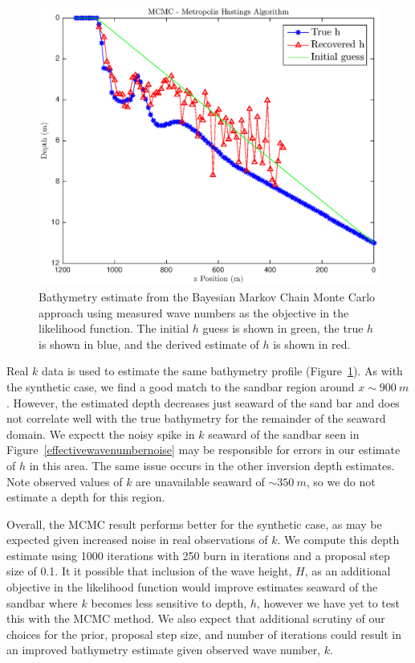 \begin{figure}[H]
\center
\includegraphics[scale=0.46]{img/REAL_plot1_chopped_propSD0_1prSD0_5_totstep1000_kOct9.eps}
\caption{Bathymetry estimate from the Bayesian Markov Chain Monte Carlo approach using measured wave numbers as the objective in the likelihood function. The initial $h$ guess is shown in green, the true $h$ is shown in blue, and the derived estimate of $h$ is shown in red.}
\label{mcmc-real}
\end{figure}

Real $k$ data is used to estimate the same bathymetry profile (Figure~\ref{mcmc-real}). As with the synthetic case, we find a good match to the sandbar region around $x\sim900~m$. However, the estimated depth decreases just seaward of the sand bar and does not correlate well with the true bathymetry for the remainder of the seaward domain. We expectt the noisy spike in $k$ seaward of the sandbar seen in  Figure~\ref{effectivewavenumbernoise} may be responsible for errors in our estimate of $h$ in this area. The same issue occurs in the other inversion depth estimates. Note observed values of $k$ are unavailable seaward of $\sim350~m$, so we do not estimate a depth for this region. 

Overall, the MCMC result performs better for the synthetic case, as may be expected given increased noise in real observations of $k$. We compute this depth estimate using 1000 iterations with 250 burn in iterations and a proposal step size of 0.1. It it possible that inclusion of the wave height, $H$, as an additional objective in the likelihood function would improve estimates seaward of the sandbar where $k$ becomes less sensitive to depth, $h$, however we have yet to test this with the MCMC method. We also expect that additional scrutiny of our choices for the prior, proposal step size, and number of iterations could result in an improved bathymetry estimate given observed wave number, $k$. 

